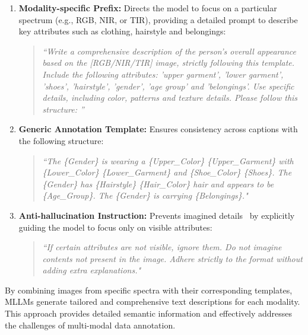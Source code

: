 \begin{enumerate}
    \item \textbf{Modality-specific Prefix:} Directs the model to focus on a particular spectrum (e.g., RGB, NIR, or TIR), providing a detailed prompt to describe key attributes such as clothing, hairstyle and belongings:
    \begin{quote}
      \small
      \textit{“Write a comprehensive description of the person's overall appearance based on the [RGB/NIR/TIR] image, strictly following this template. Include the following attributes: 'upper garment', 'lower garment', 'shoes', 'hairstyle', 'gender', 'age group' and 'belongings'. Use specific details, including color, patterns and texture details. Please follow this structure: ”}
    \end{quote}
    \item \textbf{Generic Annotation Template:} Ensures consistency across captions with the following structure:
    \begin{quote}
      \small
    \textit{“The \{Gender\} is wearing a \{Upper\_Color\} \{Upper\_Garment\} with \{Lower\_Color\} \{Lower\_Garment\} and \{Shoe\_Color\} \{Shoes\}. The \{Gender\} has \{Hairstyle\} \{Hair\_Color\} hair and appears to be \{Age\_Group\}. The \{Gender\} is carrying \{Belongings\}."}
    \end{quote}
    \item \textbf{Anti-hallucination Instruction:} Prevents imagined details~\cite{tan2024harnessing} by explicitly guiding the model to focus only on visible attributes:
    \begin{quote}
      \small
    \textit{“If certain attributes are not visible, ignore them. Do not imagine contents not present in the image. Adhere strictly to the format without adding extra explanations."}
    \end{quote}
\end{enumerate}
%
By combining images from specific spectra with their corresponding templates, MLLMs generate tailored and comprehensive text descriptions for each modality.
%
This approach provides detailed semantic information and effectively addresses the challenges of multi-modal data annotation.
%

